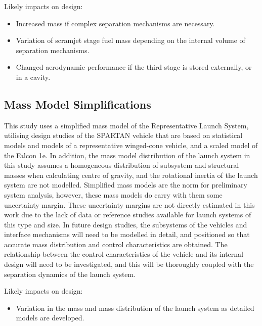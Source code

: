 Likely impacts on design:
\begin{itemize}[noitemsep,topsep=0pt]
	\item Increased mass if complex separation mechanisms are necessary.
	\item Variation of scramjet stage fuel mass depending on the internal volume of separation mechanisms. 
	\item Changed aerodynamic performance if the third stage is stored externally, or in a cavity. 
\end{itemize}


\subsection{Mass Model Simplifications}

This study uses a simplified mass model of the Representative Launch System, utilising design studies of the SPARTAN vehicle\cite{Preller2017b} that are based on statistical models and models of a representative winged-cone vehicle\cite{Preller2018}, and a scaled model of the Falcon 1e\cite{Vehicle2008}. In addition, the mass model distribution of the launch system in this study assumes a homogeneous distribution of subsystem and structural masses when calculating centre of gravity, and the rotational inertia of the launch system are not modelled.
Simplified mass models are the norm for preliminary system analysis\cite{Argus,Powell1991,Trefny1999,Roche2000,Pescetelli2012,Young2006,Bradford2000,Hyperion,Wilhite1991,Fujikawa2017,Mehta2001,Takahashi1997,Germain2001,Eklund2012,Bradford2002,Kimura1999,Preller2018a}, however, these mass models do carry with them some uncertainty margin. These uncertainty margins are not directly estimated in this work due to the lack of data or reference studies available for launch systems of this type and size. 
In future design studies, the subsystems of the vehicles and interface mechanisms will need to be modelled in detail, and positioned so that accurate mass distribution and control characteristics are obtained. The relationship between the control characteristics of the vehicle and its internal design will need to be investigated, and this will be thoroughly coupled with the separation dynamics of the launch system. 

Likely impacts on design:
\begin{itemize}[noitemsep,topsep=0pt]
	\item Variation in the mass and mass distribution of the launch system as detailed models are developed. 
\end{itemize}


